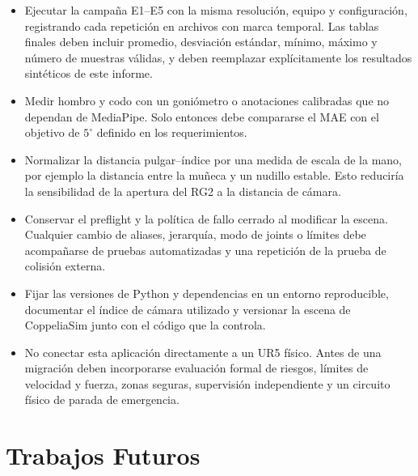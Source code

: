 \begin{itemize}
    \item Ejecutar la campaña E1--E5 con la misma resolución, equipo y
    configuración, registrando cada repetición en archivos con marca temporal.
    Las tablas finales deben incluir promedio, desviación estándar, mínimo,
    máximo y número de muestras válidas, y deben reemplazar explícitamente los
    resultados sintéticos de este informe.

    \item Medir hombro y codo con un goniómetro o anotaciones calibradas que no
    dependan de MediaPipe. Solo entonces debe compararse el MAE con el objetivo
    de $5^\circ$ definido en los requerimientos.

    \item Normalizar la distancia pulgar--índice por una medida de escala de la
    mano, por ejemplo la distancia entre la muñeca y un nudillo estable. Esto
    reduciría la sensibilidad de la apertura del RG2 a la distancia de cámara.

    \item Conservar el preflight y la política de fallo cerrado al modificar la
    escena. Cualquier cambio de aliases, jerarquía, modo de joints o límites
    debe acompañarse de pruebas automatizadas y una repetición de la prueba de
    colisión externa.

    \item Fijar las versiones de Python y dependencias en un entorno
    reproducible, documentar el índice de cámara utilizado y versionar la
    escena de CoppeliaSim junto con el código que la controla.

    \item No conectar esta aplicación directamente a un UR5 físico. Antes de
    una migración deben incorporarse evaluación formal de riesgos, límites de
    velocidad y fuerza, zonas seguras, supervisión independiente y un circuito
    físico de parada de emergencia.
\end{itemize}

\section{Trabajos Futuros}
\label{sec:trabajos_futuros}

